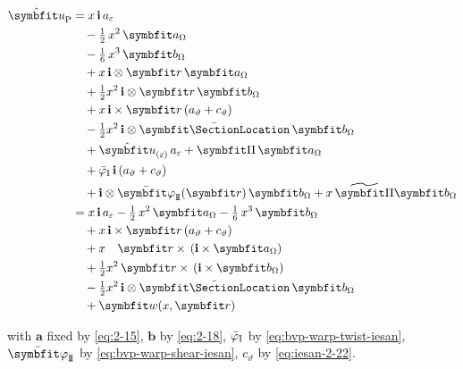 \begin{Details}
\begin{equation*}
\begin{aligned}
\hat{\bm u}_{\rm P}%
&=
 \reflenx\,\FrameBasis\,a_{\varepsilon} \\
&\quad-\tfrac12\,\reflenx^2\,\bm{a}_{\Section} \\
&\quad-\tfrac16\,\reflenx^3\,\bm{b}_{\Section} \\
&\quad+\reflenx\,\FrameBasis\otimes\bm{r}\,\bm{a}_{\Section} \\
&\quad+\tfrac12 \reflenx^2\,\FrameBasis\otimes\bm{r}\,\bm{b}_{\Section} \\
&\quad+\reflenx\,\FrameBasis\times\bm{r}\,(a_\vartheta+c_{\vartheta}) \\
&\quad-\tfrac12 \reflenx^2\,\FrameBasis\otimes\CentroidLocation\,\bm{b}_{\Section} \\
&\quad+\PlaneAxialShape\,a_{\varepsilon}
+ \PlaneShape\,\bm{a}_{\Section} \\
&\quad+\WarpTwistIesan\,\FrameBasis\,(a_\vartheta+c_{\vartheta}) \\
&\quad+\FrameBasis\otimes\WarpShearShape{}(\bm{r})\,\bm{b}_{\Section}
+\reflenx\,\PlaneShearShape\bm{b}_{\Section} \\
%
&=
 \reflenx\,\FrameBasis\,a_{\varepsilon}
-\tfrac12\,\reflenx^2\,\bm{a}_{\Section} 
-\tfrac16\,\reflenx^3\,\bm{b}_{\Section} \\
&\quad+\reflenx\,\FrameBasis\times\bm{r}\,(a_\vartheta+c_{\vartheta}) \\
&\quad+\reflenx\quad\bm{r}\times\,(\FrameBasis\times\bm{a}_{\Section}) \\
&\quad+\tfrac12 \reflenx^2\,\bm{r}\times\,(\FrameBasis\times\bm{b}_{\Section}) \\
&\quad-\tfrac12 \reflenx^2\,\FrameBasis\otimes\CentroidLocation\,\bm{b}_{\Section} \\
&\quad+\bm{w}(x,\bm{r})
\end{aligned}
\end{equation*}
\end{Details}
with \(\bm a\) fixed by \eqref{eq:2-15}, \(\bm b\) by \eqref{eq:2-18}, \(\bar{\varphi}_{\rm I}\) by \eqref{eq:bvp-warp-twist-iesan},
\(\WarpShearShape{}\) by \eqref{eq:bvp-warp-shear-iesan},  \(c_\vartheta\) by \eqref{eq:iesan-2-22}. 


